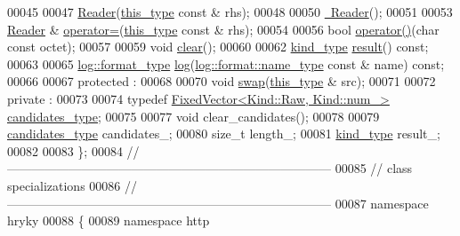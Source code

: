 \begin{DoxyCode}
00045 
00047     \hyperlink{classhryky_1_1http_1_1method_1_1_reader_a3701f1eba6ed113ec7a5450946faf22e}{Reader}(\hyperlink{classhryky_1_1http_1_1method_1_1_reader}{this_type} \textcolor{keyword}{const} & rhs);
00048 
00050     \hyperlink{classhryky_1_1http_1_1method_1_1_reader_ad1f217cf4c3efcf4ab00956a58d5abd0}{~Reader}();
00051 
00053     \hyperlink{classhryky_1_1http_1_1method_1_1_reader}{Reader} & \hyperlink{classhryky_1_1http_1_1method_1_1_reader_a40d2f84d32a43a99ecf668409aef105c}{operator=}(\hyperlink{classhryky_1_1http_1_1method_1_1_reader}{this_type} \textcolor{keyword}{const} & rhs);
00054 
00056     \textcolor{keywordtype}{bool} \hyperlink{classhryky_1_1http_1_1method_1_1_reader_a1d531ef61c2ccfbec68374fd8a7d54d2}{operator()}(\textcolor{keywordtype}{char} \textcolor{keyword}{const} octet);
00057 
00059     \textcolor{keywordtype}{void} \hyperlink{classhryky_1_1http_1_1method_1_1_reader_ab09eca2747fad07619bc0d956bbca1c9}{clear}();
00060 
00062     \hyperlink{classhryky_1_1_kind}{kind_type} \hyperlink{classhryky_1_1http_1_1method_1_1_reader_ad0755c9a31568151c396abbb78192abd}{result}() \textcolor{keyword}{const};
00063 
00065     \hyperlink{classhryky_1_1_intrusive_ptr}{log::format_type} \hyperlink{classhryky_1_1http_1_1method_1_1_reader_ada196a52c4a8951bf2052d25d2ac6786}{log}(\hyperlink{namespacehryky_1_1log_1_1format_ab7408d1e2ed2d648dbf9bba69eb74288}{log::format::name_type} \textcolor{keyword}{const} & name) \textcolor{keyword}{const};
00066 
00067 \textcolor{keyword}{protected} :
00068 
00070     \textcolor{keywordtype}{void} \hyperlink{classhryky_1_1http_1_1method_1_1_reader_a4613c2aa7c596ebc24d339b31a8d4761}{swap}(\hyperlink{classhryky_1_1http_1_1method_1_1_reader}{this_type} & src);
00071 
00072 \textcolor{keyword}{private} :
00073 
00074     \textcolor{keyword}{typedef} \hyperlink{classhryky_1_1_fixed_vector}{FixedVector<Kind::Raw, Kind::num_>} \hyperlink{classhryky_1_1_fixed_vector}{candidates_type};
00075 
00077     \textcolor{keywordtype}{void} clear\_candidates();
00078 
00079     \hyperlink{classhryky_1_1_fixed_vector}{candidates_type}     candidates\_;
00080     \textcolor{keywordtype}{size\_t}              length\_;
00081     \hyperlink{classhryky_1_1_kind}{kind_type}           result\_;
00082 
00083 \};
00084 \textcolor{comment}{//
      ------------------------------------------------------------------------------}
00085 \textcolor{comment}{// class specializations}
00086 \textcolor{comment}{//
      ------------------------------------------------------------------------------}
00087 \textcolor{keyword}{namespace }hryky
00088 \{
00089 \textcolor{keyword}{namespace }http

\end{DoxyCode}
